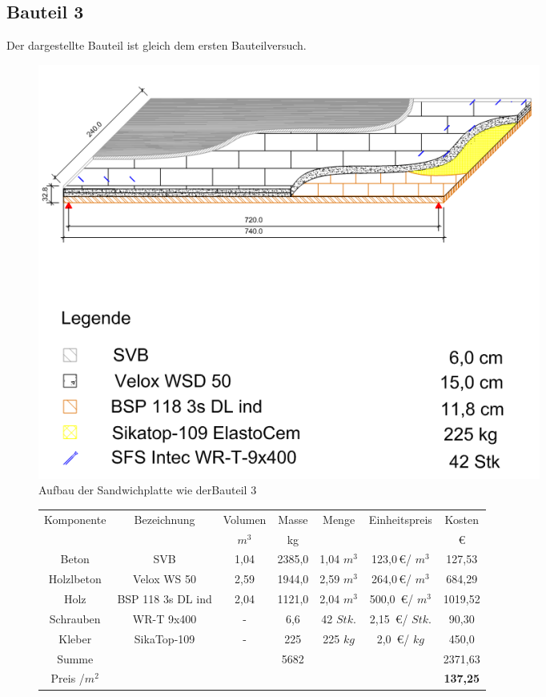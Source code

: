 \newpage
\subsection{Bauteil 3}
Der dargestellte Bauteil ist gleich dem ersten Bauteilversuch.
\begin{figure}[h!]
\begin{center}
\includegraphics[scale =0.8]{Wirtschaftlichkeitsvergleich/Varianten/var3.jpg}
\caption{Aufbau der Sandwichplatte wie derBauteil 3}
\end{center}
\end{figure}

\begin{figure}[h!]
\begin{center}
\begin{tabular}{|c|c|c|c|c|c|c|}
\hline 
Komponente & Bezeichnung & Volumen & Masse & Menge & Einheitspreis & Kosten \\ 

 &  & $m^{3}$ & kg &  &  & \euro \\ 
\hline \hline
Beton & SVB & 1,04 & 2385,0  & 1,04 $m^{3}$ & 123,0\,\euro / $m^{3}$ & 127,53 \\ 
\hline 
Holzlbeton & Velox WS 50 & 2,59 & 1944,0  & 2,59 $m^{3}$ & 264,0\,\euro / $m^{3}$ & 684,29 \\ 
\hline 
Holz & BSP 118 3s DL ind & 2,04 & 1121,0 & 2,04 $m^{3}$ & 500,0 \,\euro / $m^{3}$ & 1019,52 \\ 
\hline 
Schrauben & WR-T 9x400 & - & 6,6 & 42 $Stk.$ & 2,15 \,\euro / $Stk.$ & 90,30 \\ 
\hline 
Kleber & SikaTop-109  & - & 225 & 225 $kg$ & 2,0 \,\euro / $kg$& 450,0 \\ 
\hline \hline
Summe & &  & 5682 &  &  & 2371,63 \\ 
\hline 
Preis /$m^{2}$&  & &  &  &  & \textbf{137,25} \\ 
\hline 
\end{tabular} 
\end{center}
\end{figure}










